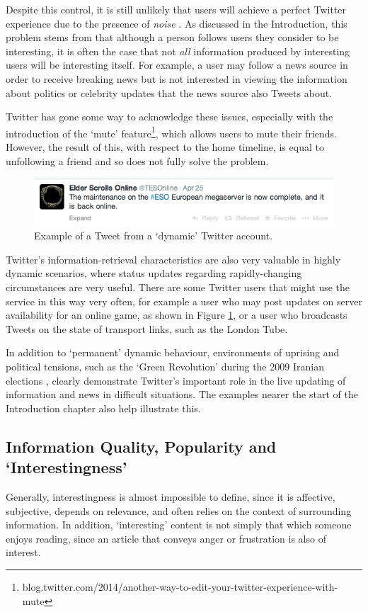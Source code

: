 Despite this control, it is still unlikely that users will achieve a perfect Twitter experience due to the presence of \textit{noise} \cite{alonso10}. As discussed in the Introduction, this problem stems from that although a person follows users they consider to be interesting, it is often the case that not \textit{all} information produced by interesting users will be interesting itself. For example, a user may follow a news source in order to receive breaking news but is not interested in viewing the information about politics or celebrity updates that the news source also Tweets about.

Twitter has gone some way to acknowledge these issues, especially with the introduction of the `mute' feature\footnote{blog.twitter.com/2014/another-way-to-edit-your-twitter-experience-with-mute}, which allows users to mute their friends. However, the result of this, with respect to the home timeline, is equal to unfollowing a friend and so does not fully solve the problem.


\begin{figure}[h]
\centering
\includegraphics[scale=0.75]{2.Background/Media/eso.png} 
\caption{Example of a Tweet from a `dynamic' Twitter account.}
\label{fig:eso}
\end{figure}

Twitter's information-retrieval characteristics are also very valuable in highly dynamic scenarios, where status updates regarding rapidly-changing circumstances are very useful. There are some Twitter users that might use the service in this way very often, for example a user who may post updates on server availability for an online game, as shown in Figure \ref{fig:eso}, or a user who broadcasts Tweets on the state of transport links, such as the London Tube.

In addition to `permanent' dynamic behaviour, environments of uprising and political tensions, such as the `Green Revolution' during the 2009 Iranian elections \cite{burns09}, clearly demonstrate Twitter's important role in the live updating of information and news in difficult situations. The examples nearer the start of the Introduction chapter also help illustrate this.



\subsection{Information Quality, Popularity and `Interestingness'}
Generally, interestingness is almost impossible to define, since it is affective, subjective, depends on relevance, and often relies on the context of surrounding information. In addition, `interesting' content is not simply that which someone enjoys reading, since an article that conveys anger or frustration is also of interest.

